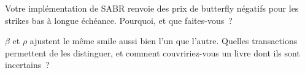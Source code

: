 \begin{interviewq}\label{iq:dv:sabr-and-smile-dynamics:5}
Votre implémentation de SABR renvoie des prix de butterfly négatifs pour les strikes bas à longue échéance. Pourquoi, et que faites-vous~?
\end{interviewq}

\begin{interviewq}\label{iq:dv:sabr-and-smile-dynamics:6}
$\beta$ et $\rho$ ajustent le même smile aussi bien l'un que l'autre. Quelles transactions permettent de les distinguer, et comment
couvririez-vous un livre dont ils sont incertains~?
\end{interviewq}
